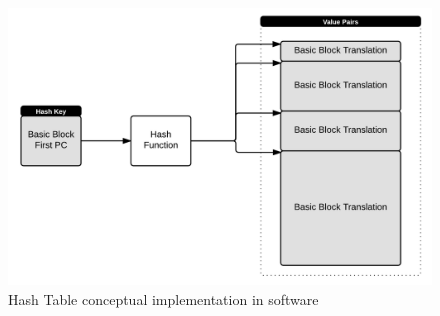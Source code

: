 \begin{figure} [h!]
	\centering
	\includegraphics[scale = 0.25]{Images/Hash.png}
	\caption{Hash Table conceptual implementation in software}
	\label{fig:Hash}
\end{figure}
